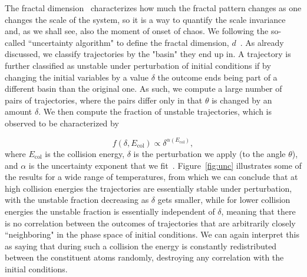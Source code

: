 \documentclass[%
 reprint,
 amsmath,amssymb,
 aps,
 nofootinbib
]{revtex4-1}
\begin{document}
The fractal dimension~\cite{mandelbrot1967} characterizes how much the fractal pattern changes as one changes the scale of the system, so it is a way to quantify the scale invariance and, as we shall see, also the moment of onset of chaos. We following the so-called ``uncertainty algorithm" to define the fractal dimension, $d$~\cite{mcdonald1985}. As already discussed, we classify trajectories by the "basin" they end up in. A trajectory is further classified as unstable under perturbation of initial conditions if by changing the initial variables by a value $\delta$ the outcome ends being part of a different basin than the original one. As such, we compute a large number of pairs of trajectories, where the pairs differ only in that $\theta$ is changed by an amount $\delta$. We then compute the fraction of unstable trajectories, which is observed to be characterized by

\begin{equation}
f(\delta, E_{\mathrm{col}}) \propto \delta^{\alpha(E_{\mathrm{col}})},
\end{equation}
where $E_{\mathrm{col}}$ is the collision energy, $\delta$ is the perturbation we apply (to the angle $\theta$), and $\alpha$ is the uncertainty exponent that we fit~\cite{mcdonald1985}. Figure~\ref{fig:unc} illustrates some of the results for a wide range of temperatures, from which we can conclude that at high collision energies the trajectories are essentially stable under perturbation, with the unstable fraction decreasing as $\delta$ gets smaller, while for lower collision energies the unstable fraction is essentially independent of $\delta$, meaning that there is no correlation between the outcomes of trajectories that are arbitrarily closely ``neighboring" in the phase space of initial conditions. We can again interpret this as saying that during such a collision the energy is constantly redistributed between the constituent atoms randomly, destroying any correlation with the initial conditions.
\end{document}
